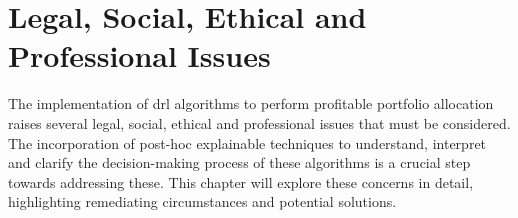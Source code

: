 \chapter{Legal, Social, Ethical and Professional Issues} \label{ch:issues}

The implementation of \acrfull{drl} algorithms to perform profitable portfolio allocation raises several legal, social, ethical and professional issues that must be considered. The incorporation of post-hoc explainable techniques to understand, interpret and clarify the decision-making process of these algorithms is a crucial step towards addressing these. This chapter will explore these concerns in detail, highlighting remediating circumstances and potential solutions.
